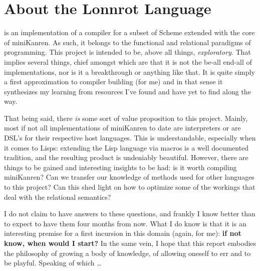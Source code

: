 \chapter*{About the Lonnrot Language}

 is an implementation of a compiler for a
subset of Scheme extended with the core of miniKanren. As such, it belongs to the
functional and relational paradigms of programming. This project is intended to be,
above all things, \textit{exploratory}. That implies several things, chief amongst which
are that it is not the be-all end-all of implementations, nor is it a breakthrough or anything like that.
It is quite simply a first approximation to compiler building (for me) and in that sense
it synthesizes my learning from resources I've found and have yet to find along the way.

That being said, there \textit{is} some sort of value proposition to this project. Mainly, most
if not all implementations of miniKanren to date are interpreters or are DSL's for their
respective host languages. This is understandable, especially when it comes to Lisps:
extending the Lisp language via macros is a well documented tradition, and the resulting
product is undeniably beautiful. However, there are things to be gained and interesting
insights to be had: is it worth compiling miniKanren? Can we transfer our knowledge of
methods used for other languages to this project? Can this shed light on how to optimize
some of the workings that deal with the relational semantics?

I do not claim to have answers to these questions, and frankly I know better than to expect to have
them four months from now. What I do know is that it is an interesting premise for a
first incursion in this domain (again, for me): \textbf{if not know, when would I start?} In the
same vein, I hope that this report embodies the philosophy of growing a body of knowledge, of
allowing oneself to err and to be playful. Speaking of which \ldots


